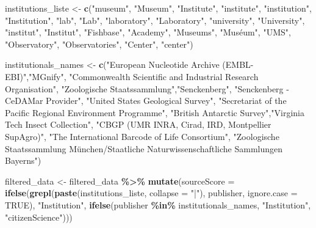 \documentclass[
]{article}
\newenvironment{Shaded}{\begin{snugshade}}{\end{snugshade}}
\newcommand{\AttributeTok}[1]{\textcolor[rgb]{0.13,0.29,0.53}{#1}}
\newcommand{\ConstantTok}[1]{\textcolor[rgb]{0.56,0.35,0.01}{#1}}
\newcommand{\FunctionTok}[1]{\textcolor[rgb]{0.13,0.29,0.53}{\textbf{#1}}}
\newcommand{\NormalTok}[1]{#1}
\newcommand{\OtherTok}[1]{\textcolor[rgb]{0.56,0.35,0.01}{#1}}
\newcommand{\SpecialCharTok}[1]{\textcolor[rgb]{0.81,0.36,0.00}{\textbf{#1}}}
\newcommand{\StringTok}[1]{\textcolor[rgb]{0.31,0.60,0.02}{#1}}
\begin{document}
\begin{Shaded}
\begin{Highlighting}[]
\NormalTok{institutions\_liste }\OtherTok{\textless{}{-}} \FunctionTok{c}\NormalTok{(}\StringTok{"museum"}\NormalTok{, }\StringTok{"Museum"}\NormalTok{, }\StringTok{"Institute"}\NormalTok{, }\StringTok{"institute"}\NormalTok{, }\StringTok{"institution"}\NormalTok{,}
                     \StringTok{"Institution"}\NormalTok{, }\StringTok{"lab"}\NormalTok{, }\StringTok{"Lab"}\NormalTok{, }\StringTok{"laboratory"}\NormalTok{, }\StringTok{"Laboratory"}\NormalTok{, }
                     \StringTok{"university"}\NormalTok{, }\StringTok{"University"}\NormalTok{, }\StringTok{"institut"}\NormalTok{, }\StringTok{"Institut"}\NormalTok{, }
                     \StringTok{"Fishbase"}\NormalTok{, }\StringTok{"Academy"}\NormalTok{, }\StringTok{"Museums"}\NormalTok{, }\StringTok{"Muséum"}\NormalTok{, }\StringTok{"UMS"}\NormalTok{, }
                     \StringTok{"Observatory"}\NormalTok{, }\StringTok{"Observatories"}\NormalTok{, }\StringTok{"Center"}\NormalTok{, }\StringTok{"center"}\NormalTok{)}

\NormalTok{institutionals\_names }\OtherTok{\textless{}{-}} \FunctionTok{c}\NormalTok{(}\StringTok{"European Nucleotide Archive (EMBL{-}EBI)"}\NormalTok{,}\StringTok{"MGnify"}\NormalTok{,}
                         \StringTok{"Commonwealth Scientific and Industrial Research Organisation"}\NormalTok{,}
                         \StringTok{"Zoologische Staatssammlung"}\NormalTok{,}\StringTok{"Senckenberg"}\NormalTok{,}
                         \StringTok{"Senckenberg {-} CeDAMar Provider"}\NormalTok{, }\StringTok{"United States Geological Survey"}\NormalTok{,}
                         \StringTok{"Secretariat of the Pacific Regional Environment Programme"}\NormalTok{,}
                         \StringTok{"British Antarctic Survey"}\NormalTok{,}\StringTok{"Virginia Tech Insect Collection"}\NormalTok{, }
                         \StringTok{"CBGP (UMR INRA, Cirad, IRD, Montpellier SupAgro)"}\NormalTok{,}
                         \StringTok{"The International Barcode of Life Consortium"}\NormalTok{,}
                         \StringTok{"Zoologische Staatssammlung München/Staatliche Naturwissenschaftliche Sammlungen Bayerns"}\NormalTok{)}

\NormalTok{filtered\_data }\OtherTok{\textless{}{-}}\NormalTok{ filtered\_data }\SpecialCharTok{\%\textgreater{}\%}
  \FunctionTok{mutate}\NormalTok{(}\AttributeTok{sourceScore =} \FunctionTok{ifelse}\NormalTok{(}\FunctionTok{grepl}\NormalTok{(}\FunctionTok{paste}\NormalTok{(institutions\_liste, }\AttributeTok{collapse =} \StringTok{"|"}\NormalTok{), }
\NormalTok{                                    publisher, }\AttributeTok{ignore.case =} \ConstantTok{TRUE}\NormalTok{), }
                               \StringTok{"Institution"}\NormalTok{,}
                              \FunctionTok{ifelse}\NormalTok{(publisher }\SpecialCharTok{\%in\%}\NormalTok{ institutionals\_names, }
                                     \StringTok{"Institution"}\NormalTok{, }\StringTok{"citizenScience"}\NormalTok{)))}
\end{Highlighting}
\end{Shaded}
\end{document}
